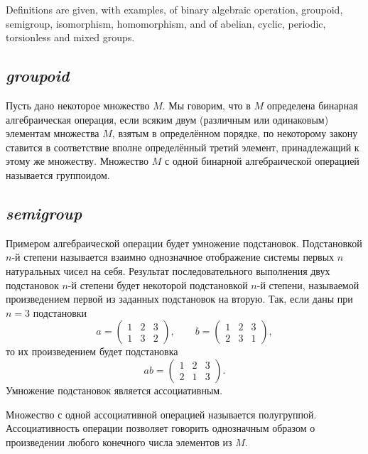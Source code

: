 
\begin{sourcebox}
Definitions are given, with examples, of binary algebraic operation, groupoid, semigroup, isomorphism, homomorphism, and of abelian, cyclic, periodic, torsionless and mixed groups.
\end{sourcebox}

\subsection*{ \textit{groupoid}}
\begin{rusblock}
Пусть дано некоторое множество $M$. Мы говорим, что в $M$ определена бинарная алгебраическая операция, если всяким двум (различным или одинаковым) элементам множества $M$, взятым в определённом порядке, по некоторому закону ставится в соответствие вполне определённый третий элемент, принадлежащий к этому же множеству. Множество $M$ с одной бинарной алгебраической операцией называется группоидом.
\end{rusblock}

\subsection*{ \textit{semigroup}}
\begin{rusblock}
Примером алгебраической операции будет умножение подстановок. Подстановкой $n$-й степени называется взаимно однозначное отображение системы первых $n$ натуральных чисел на себя. Результат последовательного выполнения двух подстановок $n$-й степени будет некоторой подстановкой $n$-й степени, называемой произведением первой из заданных подстановок на вторую. Так, если даны при $n=3$ подстановки
\[
a=\begin{pmatrix}1&2&3\\1&3&2\end{pmatrix},\qquad
b=\begin{pmatrix}1&2&3\\2&3&1\end{pmatrix},
\]
то их произведением будет подстановка
\[
ab=\begin{pmatrix}1&2&3\\2&1&3\end{pmatrix}.
\]
Умножение подстановок является ассоциативным.

Множество с одной ассоциативной операцией называется полугруппой. Ассоциативность операции позволяет говорить однозначным образом о произведении любого конечного числа элементов из $M$.
\end{rusblock}

